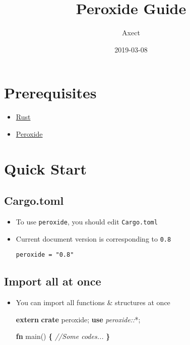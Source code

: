 \documentclass[]{book}
\title{Peroxide Guide}
\author{Axect}
\date{2019-03-08}
\newenvironment{Shaded}{\begin{snugshade}}{\end{snugshade}}
\newcommand{\CommentTok}[1]{\textcolor[rgb]{0.56,0.35,0.01}{\textit{#1}}}
\newcommand{\KeywordTok}[1]{\textcolor[rgb]{0.13,0.29,0.53}{\textbf{#1}}}
\newcommand{\NormalTok}[1]{#1}
\newcommand{\OperatorTok}[1]{\textcolor[rgb]{0.81,0.36,0.00}{\textbf{#1}}}
\newcommand{\PreprocessorTok}[1]{\textcolor[rgb]{0.56,0.35,0.01}{\textit{#1}}}
\providecommand{\tightlist}{%
  \setlength{\itemsep}{0pt}\setlength{\parskip}{0pt}}
\begin{document}
\maketitle

{
\setcounter{tocdepth}{1}
\tableofcontents
}
\hypertarget{prerequisites}{%
\chapter{Prerequisites}\label{prerequisites}}

\begin{itemize}
\tightlist
\item
  \href{https://www.rust-lang.org/tools/install}{Rust}
\item
  \href{https://crates.io/crates/peroxide}{Peroxide}
\end{itemize}

\hypertarget{quick}{%
\chapter{Quick Start}\label{quick}}

\hypertarget{cargo.toml}{%
\section{Cargo.toml}\label{cargo.toml}}

\begin{itemize}
\item
  To use \texttt{peroxide}, you should edit \texttt{Cargo.toml}
\item
  Current document version is corresponding to \texttt{0.8}

\begin{verbatim}
peroxide = "0.8"
\end{verbatim}
\end{itemize}

\hypertarget{import-all-at-once}{%
\section{Import all at once}\label{import-all-at-once}}

\begin{itemize}
\item
  You can import all functions \& structures at once

\begin{Shaded}
\begin{Highlighting}[]
\KeywordTok{extern} \KeywordTok{crate}\NormalTok{ peroxide;}
\KeywordTok{use} \PreprocessorTok{peroxide::}\NormalTok{*;}

\KeywordTok{fn}\NormalTok{ main() }\OperatorTok{\{}
    \CommentTok{//Some codes...}
\OperatorTok{\}}
\end{Highlighting}
\end{Shaded}
\end{itemize}
\end{document}
